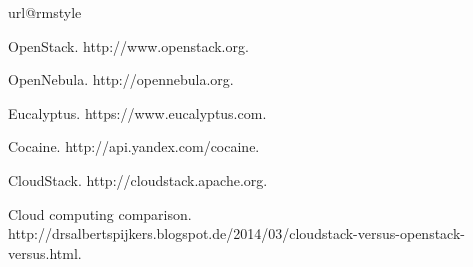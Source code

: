 
%
%
%

\begin{thebibliography}{10}
\providecommand{\url}[1]{#1}
\csname url@rmstyle\endcsname
\providecommand{\newblock}{\relax}
\providecommand{\bibinfo}[2]{#2}
\providecommand\BIBentrySTDinterwordspacing{\spaceskip=0pt\relax}
\providecommand\BIBentryALTinterwordstretchfactor{4}
\providecommand\BIBentryALTinterwordspacing{\spaceskip=\fontdimen2\font plus
\BIBentryALTinterwordstretchfactor\fontdimen3\font minus
  \fontdimen4\font\relax}
\providecommand\BIBforeignlanguage[2]{{%
\expandafter\ifx\csname l@#1\endcsname\relax
\typeout{** WARNING: IEEEtran.bst: No hyphenation pattern has been}%
\typeout{** loaded for the language `#1'. Using the pattern for}%
\typeout{** the default language instead.}%
\else
\language=\csname l@#1\endcsname
\fi
#2}}



OpenStack. http://www.openstack.org.

OpenNebula. http://opennebula.org.

Eucalyptus. https://www.eucalyptus.com.

Cocaine. http://api.yandex.com/cocaine.

CloudStack. http://cloudstack.apache.org.

Cloud computing comparison. http://drsalbertspijkers.blogspot.de/2014/03/cloudstack-versus-openstack-versus.html.


\end{thebibliography}



